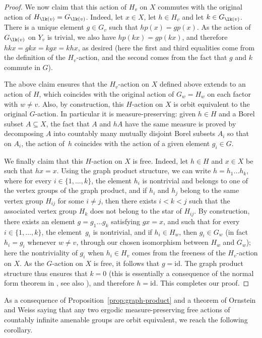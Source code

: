 \begin{proof}
We now claim that this action of $H_v$ on $X$ commutes with the original action of $H_{\lk(v)}=G_{\lk(v)}$. Indeed, let $x\in X$, let $h\in H_v$ and let $k\in G_{\lk(v)}$. There is a unique element $g\in G_v$ such that $hp(x)=gp(x)$. As the action of $G_{\lk(v)}$ on $Y_v$ is trivial, we also have $hp(kx)=gp(kx)$, and therefore $hkx=gkx=kgx=khx$, as desired (here the first and third equalities come from the definition of the $H_v$-action, and the second comes from the fact that $g$ and $k$ commute in $G$).

The above claim ensures that the $H_v$-action on $X$ defined above extends to an action of $H$, which coincides with the original action of $G_w=H_w$ on each factor with $w\neq v$. Also, by construction, this $H$-action on $X$ is orbit equivalent to the original $G$-action. In particular it is measure-preserving: given $h\in H$ and a Borel subset $A\subseteq X$, the fact that $A$ and $hA$ have the same measure is proved by decomposing $A$ into countably many mutually disjoint Borel subsets $A_i$ so that on $A_i$, the action of~$h$ coincides with the action of a given element $g_i\in G$.

We finally claim that this $H$-action on $X$ is free. Indeed, let $h\in H$ and $x\in X$ be such that $hx=x$. Using the graph product structure, we can write $h=h_1\dots h_k$, where for every $i\in\{1,\dots,k\}$, the element $h_i$ is nontrivial and belongs to one of the vertex groups of the graph product, and if $h_i$ and $h_j$ belong to the same vertex group $H_{ij}$ for some $i\neq j$, then there exists $i<k<j$ such that the associated vertex group $H_k$ does not belong to the star of $H_{ij}$. By construction, there exists an element $g=g_1\dots g_k$ satisfying $gx=x$, and such that for every $i\in\{1,\dots,k\}$, the element~$g_i$ is nontrivial, and if $h_i\in H_w$, then $g_i\in G_w$ (in fact $h_i=g_i$ whenever $w\neq v$, through our chosen isomorphism between $H_w$ and $G_w$); here the nontriviality of $g_i$ when $h_i\in H_v$ comes from the freeness of the $H_v$-action on $X$. As the $G$-action on $X$ is free, it follows that $g=\mathrm{id}$. The graph product structure thus ensures that $k=0$ (this is essentially a consequence of the normal form theorem in \cite{green1990graph}, see also \cite[\S 3]{hermiller1995algorithms}), and therefore $h=\mathrm{id}$. This completes our proof.
\end{proof}

As a consequence of Proposition~\ref{prop:graph-product} and a theorem of Ornstein and Weiss \cite{OW} saying that any two ergodic measure-preserving free actions of countably infinite amenable groups are orbit equivalent, we reach the following corollary.

